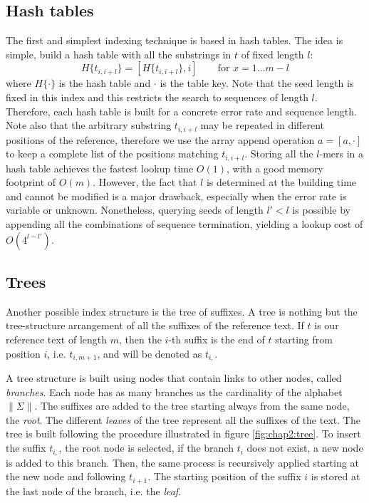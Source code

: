 \subsection{Hash tables}
\label{sec:chap2:index-hash}
The first and simplest indexing technique is based in hash tables. The
idea is simple, build a hash table with all the substrings in $t$ of
fixed length $l$:
\begin{equation}
  H\{t_{i,i+l}\} = [H\{t_{i,i+l}\}, i] \qquad \mbox{for } x=1\ldots m-l
\end{equation}
where $H\{\cdot\}$ is the hash table and $\cdot$ is the table key. Note
that the seed length is fixed in this index and this restricts the
search to sequences of length $l$. Therefore, each hash table is built
for a concrete error rate and sequence length. Note also that the
arbitrary substring $t_{i,i+l}$ may be repeated in different positions
of the reference, therefore we use the array append operation $a = [a,
  \cdot]$ to keep a complete list of the positions matching $t_{i,i+l}$.
Storing all the $l$-mers in a hash table achieves the fastest lookup
time $O(1)$, with a good memory footprint of $O(m)$. However, the
fact that $l$ is determined at the building time and cannot be
modified is a major drawback, especially when the error rate is
variable or unknown. Nonetheless, querying seeds of length $l'<l$ is
possible by appending all the combinations of sequence termination,
yielding a lookup cost of $O(4^{l-l'})$.

\subsection{Trees}
Another possible index structure is the tree of suffixes. A tree
is nothing but the tree-structure arrangement of all the suffixes of
the reference text. If $t$ is our reference text of length $m$, then
the $i$-th suffix is the end of $t$ starting from position $i$,
i.e. $t_{i,m+1}$, and will be denoted as $t_{i,}$.

A tree structure is built using nodes that contain links to other
nodes, called {\em branches}. Each node has as many branches as the
cardinality of the alphabet $\|\Sigma\|$. The suffixes are added to
the tree starting always from the same node, the {\em root}. The
different {\em leaves} of the tree represent all the suffixes of
the text. The tree is built following the procedure illustrated in
figure \ref{fig:chap2:tree}. To insert the suffix $t_{i,}$, the root node is
selected, if the branch $t_i$ does not exist, a new node is added to
this branch. Then, the same process is recursively applied starting at
the new node and following $t_{i+1}$. The starting position of the
suffix $i$ is stored at the last node of the branch, i.e. the {\em leaf}.

